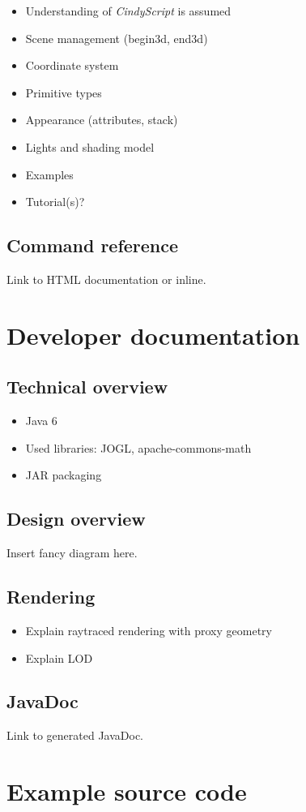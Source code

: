 \documentclass[appendixprefix,a4paper]{scrreprt}
\begin{document}
\begin{itemize}
\item Understanding of \emph{CindyScript} is assumed
\item Scene management (begin3d, end3d)
\item Coordinate system
\item Primitive types
\item Appearance (attributes, stack)
\item Lights and shading model
\item Examples
\item Tutorial(s)?
\end{itemize}

\section{Command reference}
\label{sec:comref}

Link to HTML documentation or inline.


\chapter{Developer documentation}
\label{chap:devdoc}

\section{Technical overview}

\begin{itemize}
\item Java 6
\item Used libraries: JOGL, apache-commons-math
\item JAR packaging
\end{itemize}

\section{Design overview}

Insert fancy diagram here.

\section{Rendering}

\begin{itemize}
\item Explain raytraced rendering with proxy geometry
\item Explain LOD
\end{itemize}

\section{JavaDoc}

Link to generated JavaDoc.

\appendix

\chapter{Example source code}
\label{chap:source}

\listoffigures
\end{document}

